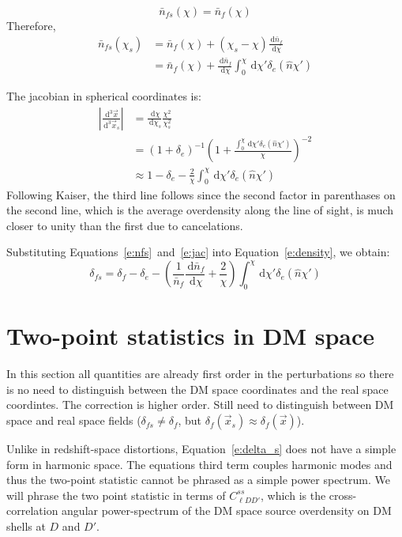 \documentclass[onecolumn,prd,nofootinbib]{revtex4-1}
\newcommand{\ud}{\,\mathrm{d}}
\begin{document}
\begin{equation}
\bar{n}_{fs}(\chi) = \bar{n}_f(\chi)
\end{equation}
Therefore,
\begin{align}
\bar{n}_{fs}(\chi_s) 
    &= \bar{n}_{f}(\chi) + (\chi_s - \chi)\frac{\ud \bar{n}_f}{\ud \chi}\\
    &= \bar{n}_{f}(\chi)
       + \frac{\ud \bar{n}_f}{\ud \chi}\int_0^\chi \ud \chi' \delta_e(\hat n \chi')
       \label{e:nfs}
\end{align}

The jacobian in spherical coordinates is:
\begin{align}
\left| \frac{\ud^3\vec x}{\ud^3\vec x_s} \right|
    &= \frac{\ud \chi}{\ud \chi_s}\frac{\chi^2}{\chi_s^2}\\
    &= (1 + \delta_e)^{-1}
       \left(1 + \frac{\int_0^\chi \ud \chi' \delta_e(\hat n \chi')}
                      {\chi}\right)^{-2}\\
    &\approx 1 - \delta_e
        - \frac{2}{\chi}\int_0^\chi \ud \chi' \delta_e(\hat n \chi')
        \label{e:jac}
\end{align}
Following Kaiser, the third line follows since the
second factor in parenthases on the second line, which is the
average overdensity along the line of sight, is much
closer to unity than the first due to cancelations.

Substituting Equations~\ref{e:nfs}~and~\ref{e:jac} into Equation~\ref{e:density},
we obtain:
\begin{equation}
\label{e:delta_s}
    \delta_{fs} = \delta_f - \delta_e
    - \left(\frac{1}{\bar{n}_f}\frac{\ud \bar{n}_f}{\ud \chi}
    + \frac{2}{\chi} \right)
        \int_0^\chi \ud \chi' \delta_e(\hat n \chi')
\end{equation}

\section{Two-point statistics in DM space}

In this section all quantities are already first order in the perturbations so
there is no need to distinguish between the DM space coordinates and the real
space coordintes. The correction is higher order. Still need to distinguish
between DM space and real space fields ($\delta_{fs} \neq \delta_f$, but
$\delta_f(\vec x_s) \approx \delta_f(\vec x)$).

Unlike in redshift-space distortions, Equation~\ref{e:delta_s} does not have a
simple form in harmonic space. The equations third term couples harmonic modes
and thus the two-point statistic cannot be phrased as a simple power spectrum.
We will phrase the two point statistic in terms of $C^{ss}_{\ell D D'}$, which is
the cross-correlation angular power-spectrum of the DM space source overdensity
on DM shells at $D$ and $D'$.
\end{document}
